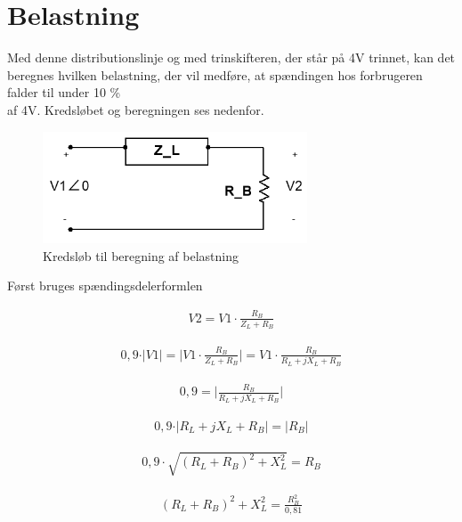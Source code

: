 
\section{Belastning}

Med denne distributionslinje og med trinskifteren, der står på 4V trinnet, kan det beregnes hvilken belastning, der vil medføre, at spændingen hos forbrugeren falder til under 10 \% \\ af 4V. Kredsløbet og beregningen ses nedenfor.

\begin{figure}[htbp] %
	\centering
	\includegraphics[width=0.7\textwidth]{Figure/Belastningberegning}
	\caption{Kredsløb til beregning af belastning}
	\label{fig:Belastningberegning}
\end{figure}

Først bruges spændingsdelerformlen

\begin{align}
	V2=V1\cdot\frac{R_B}{Z_L+R_B}
\end{align}

\begin{align}
	0,9\cdot\vert V1 \vert = \vert V1\cdot\frac{R_B}{Z_L+R_B} \vert = V1\cdot\frac{R_B}{R_L+jX_L+R_B}
\end{align}

\begin{align}
0,9= \vert \frac{R_B}{R_L+jX_L+R_B} \vert
\end{align}

\begin{align}
	0,9\cdot\vert R_L+jX_L+R_B \vert = \vert R_B \vert
\end{align}

\begin{align}
0,9\cdot\sqrt{(R_L+R_B)^2+X_L^2}=R_B
\end{align}

\begin{align}
(R_L+R_B)^2+X_L^2=\frac{R_B^2}{0,81}
\end{align}

